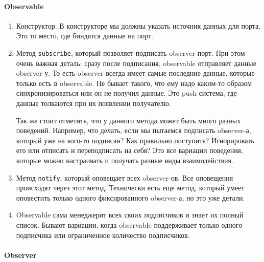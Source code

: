 \paragraph{Observable}
\begin{enumerate}
\item Конструктор.
В конструкторе мы должны указать источник данных для порта.
Это то место, где биндятся данные на порт.

\item Метод \verb"subscribe", который позволяет подписать observer порт.
При этом очень важная деталь: сразу после подписания, observable отправляет данные observer-у.
То есть observer всегда имеет самые последние данные, которые только есть в observable.
Не бывает такого, что ему надо каким-то образом синхронизироваться или он не получил данные.
Это push система, где данные толкаются при их появлении получателю.

Так же стоит отметить, что у данного метода может быть много разных поведений.
Например, что делать, если мы пытаемся подписать observer-а, который уже на кого-то подписан?
Как правильно поступить?
Игнорировать его или отписать и переподписать на себя?
Это все вариации поведения, которые можно настраивать и получать разные виды взаимодействия.

\item Метод \verb"notify", который оповещает всех observer-ов.
Все оповещения происходят через этот метод.
Технически есть еще метод, который умеет оповестить только одного фиксированного observer-а, но это уже детали.

\item Observable сама менеджерит всех своих подписчиков и знает их полный список.
Бывают вариации, когда observable поддерживает только одного подписчика или ограниченное количество подписчиков.
\end{enumerate}

\paragraph{Observer}

